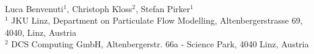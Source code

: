 
\begin{center}
\Large \textbf {\myTitle}\\
\bigskip
\normalsize{Luca Benvenuti$^1$, Christoph Kloss$^2$, Stefan Pirker$^1$}\\
\small {$^1$ JKU Linz, Department on Particulate
Flow Modelling, Altenbergerstrasse 69, 4040, Linz, Austria \\}
\small {$^2$ DCS Computing GmbH, Altenbergerstr. 66a - Science Park, 4040
 Linz, Austria}
\end{center}
% 
% 
% 
% 
% 
% 
% 
% 
